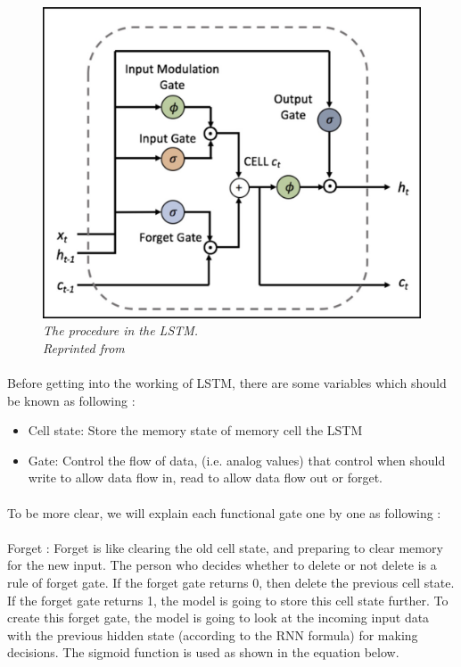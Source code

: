 \begin{figure}[H]
  \centering
  \caption[The procedure inside the LSTM.]{\emph{The procedure in the LSTM. \\ Reprinted from  \citeauthor{sirinart_tangruamsub_2017} \citeyear{sirinart_tangruamsub_2017}}}\label{fig:LSTM}
  \includegraphics[scale = 0.3]{figures/LSTM.jpg}  
\end{figure}

\paragraph{}
Before getting into the working of LSTM, there are some variables which should be known as following \cite{sirinart_tangruamsub_2017}:
\begin{itemize}
\item Cell state: Store the memory state of memory cell the LSTM
\item Gate: Control the flow of data, (i.e. analog values) that control when should write to allow data flow in, read to allow data flow out or forget.
\end{itemize}
\paragraph{}
To be more clear, we will explain each functional gate one by one as following :

\paragraph{}
Forget : Forget is like clearing the old cell state, and preparing to clear memory for the new input. The person who decides whether to delete or not delete is a rule of forget gate. If the forget gate returns 0, then delete the previous cell state. If the forget gate returns 1, the model is going to store this cell state further. To create this forget gate, the model is going to look at the incoming input data with the previous hidden state (according to the RNN formula) for making decisions. The sigmoid function is used as shown in the equation below.

